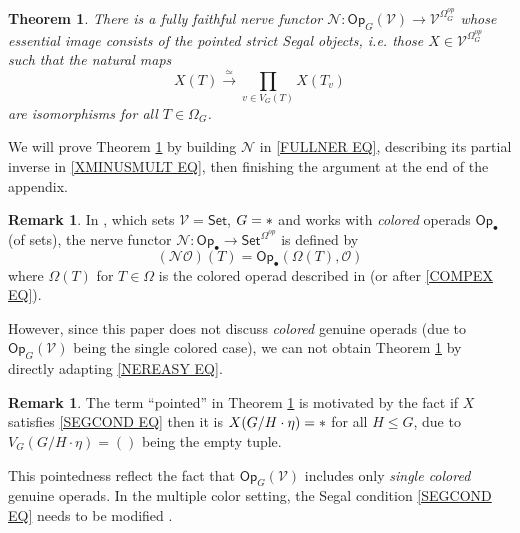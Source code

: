 \documentclass[a4paper,10pt
,draft
]{article}%
\numberwithin{equation}{section}
\numberwithin{figure}{section}
\newtheorem{theorem}[equation]{Theorem}%
\theoremstyle{definition} %
\newtheorem{remark}[equation]{Remark}%
\newcommand{\1}{\ensuremath{\mathbbm 1}}%
\begin{document}
\begin{theorem}\label{NERVE THM}
	There is a fully faithful nerve functor
	$\mathcal{N} \colon \mathsf{Op}_G(\mathcal{V})
	\to 
	\mathcal{V}^{\Omega_G^{op}}$
	whose essential image 
	consists of the pointed strict Segal objects,
	i.e. those $X \in \mathcal{V}^{\Omega_G^{op}}$
	such that the natural maps
	\begin{equation}\label{SEGCOND EQ}
	X(T) \xrightarrow{\simeq}
	\prod_{v \in V_G(T)} X(T_v)
	\end{equation}
	are isomorphisms for all $T \in \Omega_G$.
\end{theorem}

We will prove Theorem \ref{NERVE THM} by building 
$\mathcal{N}$ in \eqref{FULLNER EQ},
describing its partial inverse in \eqref{XMINUSMULT EQ},
then finishing the argument at the end of the appendix. 



\begin{remark}
	In \cite{MW08}, which sets 
	$\mathcal{V} = \mathsf{Set}$, $G = \**$
	and works with \emph{colored} operads 
	$\mathsf{Op}_{\bullet}$ (of sets),
	the nerve functor
	$\mathcal{N} \colon 
	\mathsf{Op}_{\bullet} \to \mathsf{Set}^{\Omega^{op}}$
	is defined by
\begin{equation}\label{NEREASY EQ}
	(\mathcal{N} \mathcal{O})(T)
=
	\mathsf{Op}_{\bullet}\left(
	\Omega(T),\mathcal{O}
	\right)
\end{equation}
where $\Omega(T)$ for $T \in \Omega$
is the colored operad described in
\cite[\S 3]{MW07} (or after \eqref{COMPEX EQ}).

However, since this paper does not
discuss \emph{colored} genuine operads 
(due to $\mathsf{Op}_G(\mathcal{V})$
being the single colored case),
we can not obtain
Theorem \ref{NERVE THM} by 
directly adapting \eqref{NEREASY EQ}.
\end{remark}


\begin{remark}
	The term ``pointed'' in Theorem \ref{NERVE THM}
	is motivated by the fact if 
	$X$ satisfies \eqref{SEGCOND EQ}
	then it is $X(G/H \cdot \eta) = \**$ for all $H \leq G$,
	due to $V_G(G/H \cdot \eta) = ()$ being the empty tuple.
	
	This pointedness reflect the fact that
	$\mathsf{Op}_G(\mathcal{V})$
	includes only \emph{single colored} genuine operads. 
	In the multiple color setting,
	the Segal condition \eqref{SEGCOND EQ} needs to be modified
	\cite[Def. 3.35]{BP_edss}.
\end{remark}
\end{document}
